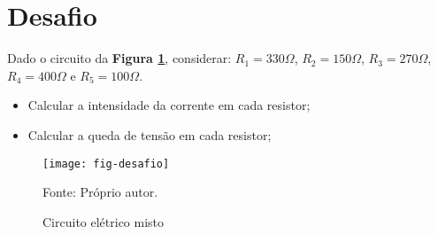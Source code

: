 \section{Desafio}

\begin{minipage}{\linewidth}
  \centering
  \begin{minipage}{0.45\linewidth}
    Dado o circuito da \textbf{Figura \ref{fig:CircuitoDesafio}},
    considerar: $R_1 = 330\Omega$,
                $R_2 = 150\Omega$,
                $R_3 = 270\Omega$, \\
                $R_4 = 400\Omega$ e
                $R_5 = 100\Omega$.
    \begin{itemize}
      \item Calcular a intensidade da corrente em cada resistor;
      \item Calcular a queda de tensão em cada resistor;
    \end{itemize}
  \end{minipage}
  \hspace{0.05\linewidth}
  \begin{minipage}{0.45\linewidth}
    \begin{figure}[H]
      \centering
      \caption{Circuito elétrico misto}
      \label{fig:CircuitoDesafio}
      \texttt{[image: fig-desafio]}

      {\small Fonte: Próprio autor.}
    \end{figure}
  \end{minipage}
\end{minipage}
